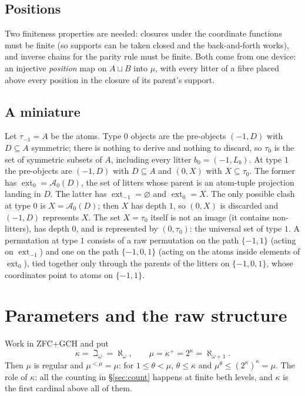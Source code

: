 \documentclass[11pt]{article}
\theoremstyle{definition}
\theoremstyle{remark}
\newcommand{\ext}{\operatorname{ext}}
\newcommand{\calA}{\mathcal A}
\begin{document}
\subsection{Positions}
Two finiteness properties are needed: closures under the coordinate
functions must be finite (so supports can be taken closed and the
back-and-forth works), and inverse chains for the parity rule must be
finite. Both come from one device: an injective \emph{position} map on
\(A\sqcup B\) into \(\mu\), with every litter of a fibre placed above every
position in the closure of its parent's support.

\subsection{A miniature}\label{sec:miniature}
Let \(\tau_{-1}=A\) be the atoms. Type \(0\) objects are the pre-objects
\((-1,D)\) with \(D\subseteq A\) symmetric; there is nothing to derive and
nothing to discard, so \(\tau_0\) is the set of symmetric subsets of
\(A\), including every litter \(b_0=(-1,L_b)\). At type \(1\) the
pre-objects are \((-1,D)\) with \(D\subseteq A\) and \((0,X)\) with
\(X\subseteq\tau_0\). The former has \(\ext_0=\calA_0(D)\), the set of
litters whose parent is an atom-tuple projection landing in \(D\). The
latter has \(\ext_{-1}=\varnothing\) and \(\ext_0=X\). The only possible
clash at type \(0\) is \(X=\calA_0(D)\); then \(X\) has depth \(1\), so
\((0,X)\) is discarded and \((-1,D)\) represents \(X\). The set
\(X=\tau_0\) itself is not an image (it contains non-litters), has depth
\(0\), and is represented by \((0,\tau_0)\): the universal set of type
\(1\). A permutation at type \(1\) consists of a raw permutation on the
path \(\{-1,1\}\) (acting on \(\ext_{-1}\)) and one on the path
\(\{-1,0,1\}\) (acting on the atoms inside elements of \(\ext_0\)), tied
together only through the parents of the litters on \(\{-1,0,1\}\), whose
coordinates point to atoms on \(\{-1,1\}\).

\section{Parameters and the raw structure}\label{sec:raw}

Work in ZFC+GCH and put
\[
 \kappa=\beth_\omega=\aleph_\omega,\qquad
 \mu=\kappa^+=2^\kappa=\aleph_{\omega+1}.
\]
Then \(\mu\) is regular and \(\mu^{<\mu}=\mu\): for \(1\leq\theta<\mu\),
\(\theta\leq\kappa\) and \(\mu^\theta\leq(2^\kappa)^\kappa=\mu\). The
role of \(\kappa\): all the counting in \S\ref{sec:count} happens at finite
beth levels, and \(\kappa\) is the first cardinal above all of them.
\end{document}
